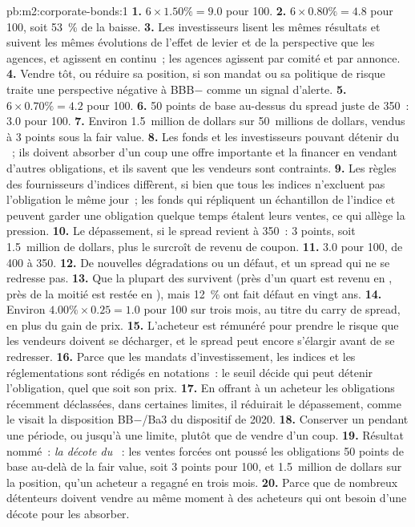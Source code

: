 \begin{solution}{pb:m2:corporate-bonds:1}
\textbf{1.} $6 \times 1.50\% = 9.0$ pour 100.
\textbf{2.} $6 \times 0.80\% = 4.8$ pour 100, soit 53~\% de la baisse.
\textbf{3.} Les investisseurs lisent les mêmes résultats et suivent les mêmes évolutions de l'effet de levier et de la perspective
que les agences, et agissent en continu~; les agences agissent par comité et
par annonce.
\textbf{4.} Vendre tôt, ou réduire sa position, si son mandat ou sa politique de risque traite une
perspective négative à BBB$-$ comme un signal d'alerte.
\textbf{5.} $6 \times 0.70\% = 4.2$ pour 100.
\textbf{6.} 50 points de base au-dessus du spread juste de 350~: 3.0 pour 100.
\textbf{7.} Environ 1.5~million de dollars sur 50~millions de dollars, vendus à 3 points sous la fair value.
\textbf{8.} Les fonds  et les investisseurs pouvant détenir du ~; ils doivent absorber
d'un coup une offre importante et la financer en vendant d'autres obligations, et ils savent que les vendeurs
sont contraints.
\textbf{9.} Les règles des fournisseurs d'indices diffèrent, si bien que tous les indices n'excluent pas l'obligation le
même jour~; les fonds qui répliquent un échantillon de l'indice et peuvent garder une obligation
quelque temps étalent leurs ventes, ce qui allège la pression.
\textbf{10.} Le dépassement, si le spread revient à 350~: 3 points, soit 1.5~million de dollars,
plus le surcroît de revenu de coupon.
\textbf{11.} 3.0 pour 100, de 400 à 350.
\textbf{12.} De nouvelles dégradations ou un défaut, et un spread qui ne se redresse pas.
\textbf{13.} Que la plupart des  survivent (près d'un quart est revenu en
, près de la moitié est restée en ), mais 12~\% ont fait défaut en vingt ans.
\textbf{14.} Environ $4.00\% \times 0.25 = 1.0$ pour 100 sur trois mois, au titre du
carry de spread, en plus du gain de prix.
\textbf{15.} L'acheteur est rémunéré pour prendre le risque que les vendeurs doivent se décharger, et le
spread peut encore s'élargir avant de se redresser.
\textbf{16.} Parce que les mandats d'investissement, les indices et les réglementations sont rédigés en
notations~: le seuil décide qui peut détenir l'obligation, quel que soit son prix.
\textbf{17.} En offrant à un acheteur les obligations récemment déclassées, dans certaines limites, il
réduirait le dépassement, comme le visait la disposition BB$-$/Ba3 du dispositif de 2020.
\textbf{18.} Conserver un  pendant une période, ou jusqu'à une limite, plutôt que de vendre
d'un coup.
\textbf{19.} Résultat nommé~: \emph{la décote du }~: les ventes forcées ont poussé
les obligations 50 points de base au-delà de la fair value, soit 3 points pour 100, et 1.5~million de dollars sur la
position, qu'un acheteur a regagné en trois mois.
\textbf{20.} Parce que de nombreux détenteurs doivent vendre au même moment à des acheteurs qui ont besoin
d'une décote pour les absorber.
\end{solution}

